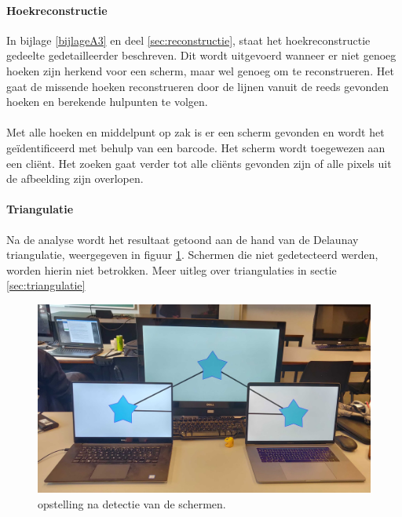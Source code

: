 \paragraph{Hoekreconstructie}
In bijlage \ref{bijlageA3} en deel \ref{sec:reconstructie}, staat het hoekreconstructie gedeelte gedetailleerder beschreven. Dit wordt uitgevoerd wanneer er niet genoeg hoeken zijn herkend voor een scherm, maar wel genoeg om te reconstrueren. Het gaat de missende hoeken reconstrueren door de lijnen vanuit de reeds gevonden hoeken en berekende hulpunten te volgen.
\paragraph{}
Met alle hoeken en middelpunt op zak is er een scherm gevonden en wordt het geïdentificeerd met behulp van een barcode. Het scherm wordt toegewezen aan een cliënt. Het zoeken gaat verder tot alle cliënts gevonden zijn of alle pixels uit de afbeelding zijn overlopen.

\paragraph{Triangulatie}
Na de analyse wordt het resultaat getoond aan de hand van de Delaunay triangulatie, weergegeven in figuur \ref{fig:triang}. Schermen die niet gedetecteerd werden, worden hierin niet betrokken. Meer uitleg over triangulaties in sectie \ref{sec:triangulatie}
\begin{figure}[H]
	\centering
	\includegraphics[scale=0.09]{img/triang.jpg}
	\caption{opstelling na detectie van de schermen.}
	\label{fig:triang}
\end{figure}

